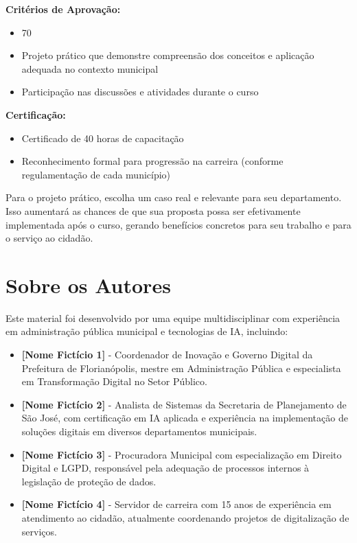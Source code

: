 \documentclass[12pt,a4paper]{book}
\begin{document}
\textbf{Critérios de Aprovação:}
\begin{itemize}
    \item 70%
    \item Projeto prático que demonstre compreensão dos conceitos e aplicação adequada no contexto municipal
    \item Participação nas discussões e atividades durante o curso
\end{itemize}

\textbf{Certificação:}
\begin{itemize}
    \item Certificado de 40 horas de capacitação
    \item Reconhecimento formal para progressão na carreira (conforme regulamentação de cada município)
\end{itemize}

\begin{tcolorbox}[dica]
Para o projeto prático, escolha um caso real e relevante para seu departamento. Isso aumentará as chances de que sua proposta possa ser efetivamente implementada após o curso, gerando benefícios concretos para seu trabalho e para o serviço ao cidadão.
\end{tcolorbox}

\backmatter

\chapter*{Sobre os Autores}

Este material foi desenvolvido por uma equipe multidisciplinar com experiência em administração pública municipal e tecnologias de IA, incluindo:

\begin{itemize}
    \item \textbf{[Nome Fictício 1]} - Coordenador de Inovação e Governo Digital da Prefeitura de Florianópolis, mestre em Administração Pública e especialista em Transformação Digital no Setor Público.
    
    \item \textbf{[Nome Fictício 2]} - Analista de Sistemas da Secretaria de Planejamento de São José, com certificação em IA aplicada e experiência na implementação de soluções digitais em diversos departamentos municipais.
    
    \item \textbf{[Nome Fictício 3]} - Procuradora Municipal com especialização em Direito Digital e LGPD, responsável pela adequação de processos internos à legislação de proteção de dados.
    
    \item \textbf{[Nome Fictício 4]} - Servidor de carreira com 15 anos de experiência em atendimento ao cidadão, atualmente coordenando projetos de digitalização de serviços.
\end{itemize}
\end{document}
